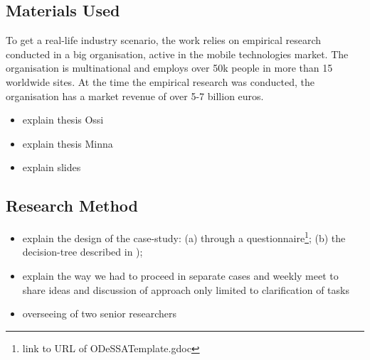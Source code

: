 \documentclass[conference]{IEEEtran}
\begin{document}
\subsection{Materials Used}
To get a real-life industry scenario, the work relies on empirical research conducted in a big organisation, active in the mobile technologies market. The organisation is multinational and employs over 50k people in more than 15 worldwide sites. At the time the empirical research was conducted, the organisation has a market revenue of over 5-7 billion euros. 
\begin{itemize}
\item explain thesis Ossi
\item explain thesis Minna
\item explain slides
\end{itemize}

\subsection{Research Method}
\begin{itemize}
\item explain the design of the case-study: (a) through a questionnaire\footnote{link to URL of ODeSSATemplate.gdoc}; (b) the decision-tree described in \cite{specissue});
\item explain the way we had to proceed in separate cases and weekly meet to share ideas and discussion of approach only limited to clarification of tasks
\item overseeing of two senior researchers
\end{itemize}

%
%
\end{document}
